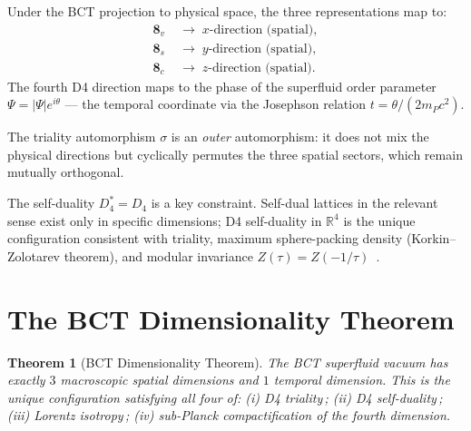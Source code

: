 \documentclass[aps,prl,twocolumn,showpacs,superscriptaddress]{revtex4-2}
\newtheorem{theorem}{Theorem}
\begin{document}
Under the BCT projection to physical space, the three representations
map to:
\begin{align*}
  \mathbf{8}_v &\;\longrightarrow\; x\text{-direction (spatial)},\\
  \mathbf{8}_s &\;\longrightarrow\; y\text{-direction (spatial)},\\
  \mathbf{8}_c &\;\longrightarrow\; z\text{-direction (spatial)}.
\end{align*}
The fourth D4 direction maps to the phase of the superfluid order
parameter $\Psi = |\Psi|e^{i\theta}$ --- the temporal coordinate via
the Josephson relation $t = \theta/(2m_P c^2)$.

The triality automorphism $\sigma$ is an \emph{outer} automorphism:
it does not mix the physical directions but cyclically permutes the
three spatial sectors, which remain mutually orthogonal.

The self-duality $D_4^* = D_4$ is a key constraint. Self-dual lattices
in the relevant sense exist only in specific dimensions; D4 self-duality
in $\mathbb{R}^4$ is the unique configuration consistent with triality,
maximum sphere-packing density (Korkin--Zolotarev theorem), and modular
invariance $Z(\tau) = Z(-1/\tau)$~\cite{L18}.

\section{The BCT Dimensionality Theorem}

\begin{theorem}[BCT Dimensionality Theorem]
The BCT superfluid vacuum has exactly $3$ macroscopic spatial
dimensions and $1$ temporal dimension. This is the unique configuration
satisfying all four of\/: \emph{(i)} D4 triality\,; \emph{(ii)} D4
self-duality\,; \emph{(iii)} Lorentz isotropy\,; \emph{(iv)} sub-Planck
compactification of the fourth dimension.
\end{theorem}
\end{document}
